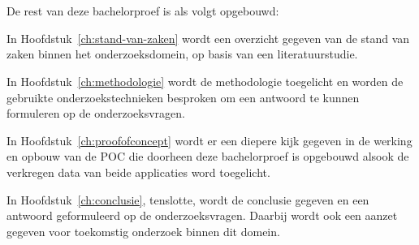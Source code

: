\section{}%
\label{sec:opzet-bachelorproef}


De rest van deze bachelorproef is als volgt opgebouwd:

In Hoofdstuk~\ref{ch:stand-van-zaken} wordt een overzicht gegeven van de stand van zaken binnen het onderzoeksdomein, op basis van een literatuurstudie.

In Hoofdstuk~\ref{ch:methodologie} wordt de methodologie toegelicht en worden de gebruikte onderzoekstechnieken besproken om een antwoord te kunnen formuleren op de onderzoeksvragen.

In Hoofdstuk~\ref{ch:proofofconcept} wordt er een diepere kijk gegeven in de werking en opbouw van de POC die doorheen deze bachelorproef is opgebouwd alsook de verkregen data van beide applicaties word toegelicht.

In Hoofdstuk~\ref{ch:conclusie}, tenslotte, wordt de conclusie gegeven en een antwoord geformuleerd op de onderzoeksvragen. Daarbij wordt ook een aanzet gegeven voor toekomstig onderzoek binnen dit domein.